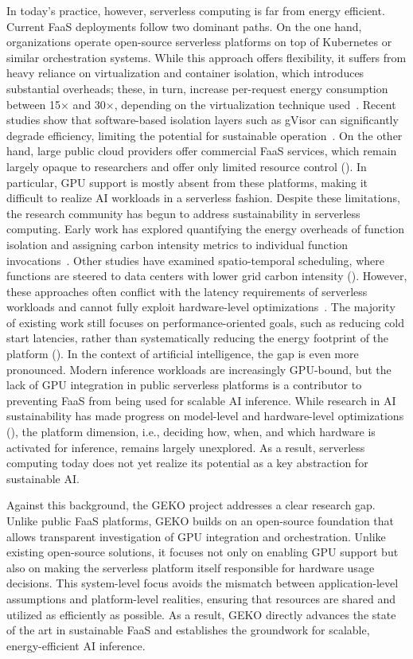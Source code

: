 In today's practice, however, serverless computing is far from energy efficient.
Current FaaS deployments follow two dominant paths. 
On the one hand, organizations operate open-source serverless platforms on top of Kubernetes or similar orchestration systems. 
While this approach offers flexibility, it suffers from heavy reliance on virtualization and container isolation, which introduces substantial overheads; these, in turn, increase per-request energy consumption between 15$\times$ and 30$\times$, depending on the virtualization technique used~\cite{sharma_challenges_2023}.
Recent studies show that software-based isolation layers such as gVisor can significantly degrade efficiency, limiting the potential for sustainable operation~\cite{young_true_nodate}. 
On the other hand, large public cloud providers offer commercial FaaS services, which remain largely opaque to researchers and offer only limited resource control (). 
In particular, GPU support is mostly absent from these platforms, making it difficult to realize AI workloads in a serverless fashion.
Despite these limitations, the research community has begun to address sustainability in serverless computing. 
Early work has explored quantifying the energy overheads of function isolation and assigning carbon intensity metrics to individual function invocations~\cite{sharma_accountable_2024}.
Other studies have examined spatio-temporal scheduling, where functions are steered to data centers with lower grid carbon intensity (). 
However, these approaches often conflict with the latency requirements of serverless workloads and cannot fully exploit hardware-level optimizations~\cite{sukprasert_limitations_2024}. 
The majority of existing work still focuses on performance-oriented goals, such as reducing cold start latencies, rather than systematically reducing the energy footprint of the platform ().
In the context of artificial intelligence, the gap is even more pronounced. 
Modern inference workloads are increasingly GPU-bound, but the lack of GPU integration in public serverless platforms is a contributor to preventing FaaS from being used for scalable AI inference. 
While research in AI sustainability has made progress on model-level and hardware-level optimizations (), the platform dimension, i.e., deciding how, when, and which hardware is activated for inference, remains largely unexplored. 
As a result, serverless computing today does not yet realize its potential as a key abstraction for sustainable AI.

Against this background, the GEKO project addresses a clear research gap. 
Unlike public FaaS platforms, GEKO builds on an open-source foundation that allows transparent investigation of GPU integration and orchestration. 
Unlike existing open-source solutions, it focuses not only on enabling GPU support but also on making the serverless platform itself responsible for hardware usage decisions. 
This system-level focus avoids the mismatch between application-level assumptions and platform-level realities, ensuring that resources are shared and utilized as efficiently as possible. 
As a result, GEKO directly advances the state of the art in sustainable FaaS and establishes the groundwork for scalable, energy-efficient AI inference.
